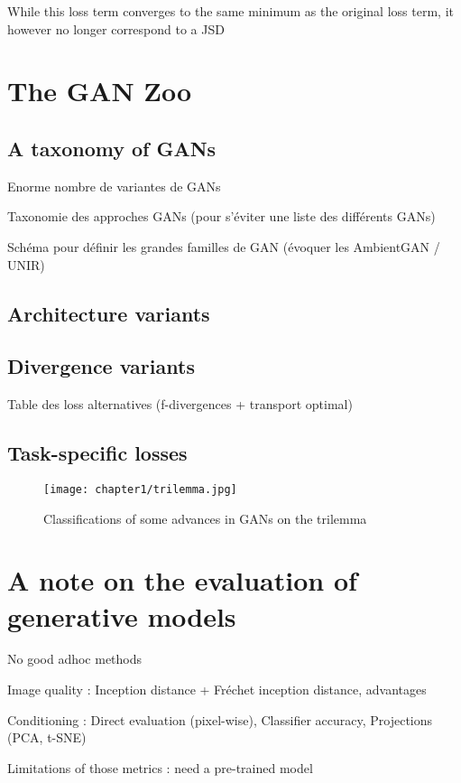  While this loss term converges to the same minimum as the original loss term, it however no longer correspond to a \ac{JSD}

\section{The GAN Zoo}

\subsection{A taxonomy of GANs}
Enorme nombre de variantes de GANs

Taxonomie des approches GANs (pour s'éviter une liste des différents GANs)

Schéma pour définir les grandes familles de GAN (évoquer les AmbientGAN / UNIR)

\subsection{Architecture variants}

\subsection{Divergence variants}
Table des loss alternatives (f-divergences + transport optimal)

\subsection{Task-specific losses}

\begin{figure}
	\texttt{[image: chapter1/trilemma.jpg]}
	\caption{Classifications of some advances in GANs on the trilemma}
\end{figure}

\section{A note on the  evaluation of generative models}

No good adhoc methods

Image quality : Inception distance + Fréchet inception distance, advantages

Conditioning : Direct evaluation (pixel-wise), Classifier accuracy, Projections (PCA, t-SNE)

Limitations of those metrics : need a pre-trained model


